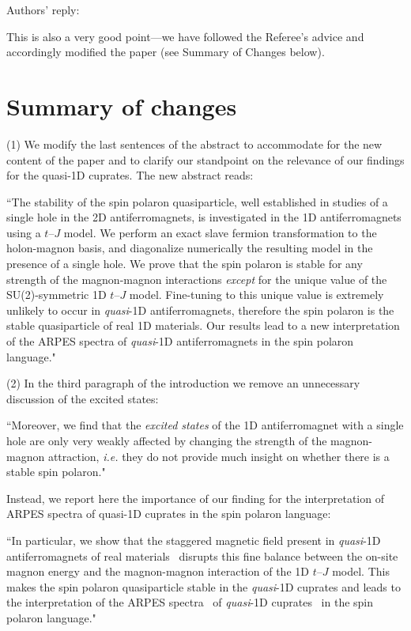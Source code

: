 \documentclass[%
 manuscript,
 amsmath,amssymb,
 aps, onecolumn,
prl,
]{revtex4-1}
\begin{document}
Authors' reply:

This is also a very good point---we have followed the Referee's advice and accordingly modified the paper (see Summary of Changes below).

\newpage

\section{Summary of changes}

(1) We modify the last sentences of the abstract to accommodate for the new content of the paper and to clarify our standpoint on the relevance of our findings for the quasi-1D cuprates. The new abstract reads:

``The stability of the spin polaron quasiparticle, well established in studies of a single hole in the 2D antiferromagnets, is investigated in the 1D antiferromagnets using a $t$--$J$ model. We  perform an exact slave fermion transformation to the holon-magnon basis, and  diagonalize numerically the resulting model in the presence of a single hole. We prove that the spin polaron is stable for any strength of the magnon-magnon interactions {\it except} for the unique value of the SU(2)-symmetric 1D $t$--$J$ model. Fine-tuning to this unique value is extremely unlikely to occur in {\it quasi}-1D antiferromagnets, therefore the spin polaron is the stable quasiparticle of real 1D materials. Our results lead to a new interpretation of the ARPES spectra of {\it quasi}-1D antiferromagnets in the spin polaron language."

(2) In the third paragraph of the introduction we remove an unnecessary discussion of the excited states:

``Moreover, we find that the {\it excited states} of the 1D  antiferromagnet with a single hole are only very weakly affected by changing the strength of the magnon-magnon attraction, {\it i.e.} they do not provide much insight on whether there is a stable spin polaron."

Instead, we report here the importance of our finding for the interpretation of ARPES spectra of quasi-1D cuprates in the spin polaron language:

``In particular, we show that the staggered magnetic field present in {\it quasi}-1D antiferromagnets of real materials~\cite{Kojima1997, Matsuda1997, Lake2005} disrupts this fine balance between the on-site magnon energy and the magnon-magnon interaction of the 1D $t$--$J$ model. This makes the spin polaron quasiparticle stable in the {\it quasi}-1D cuprates and leads to the interpretation of the ARPES spectra~\cite{Sobota2021} of {\it quasi}-1D cuprates~\cite{Kim96, Kim1997, Fujisawa1999, Koitzsch2006, Kim06} in the spin polaron language."
\end{document}
